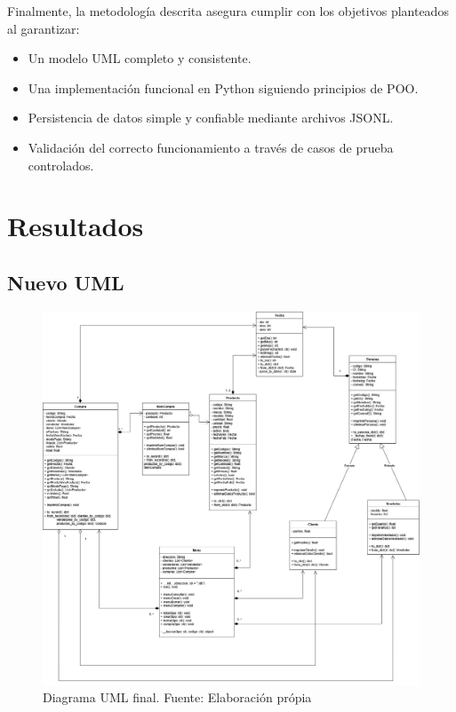 \documentclass[11pt]{article}
\begin{document}
\begin{enumerate}
Finalmente, la metodología descrita asegura cumplir con los objetivos planteados al garantizar:
\begin{itemize}
    \item Un modelo UML completo y consistente.
    \item Una implementación funcional en Python siguiendo principios de POO.
    \item Persistencia de datos simple y confiable mediante archivos JSONL.
    \item Validación del correcto funcionamiento a través de casos de prueba controlados.
\end{itemize}
\end{enumerate}



\section{Resultados}\label{sec:resultados}

\subsection{Nuevo UML}

\begin{figure}[H]
    \centering
    \includegraphics[width=0.84\linewidth]{./anexos/Diagrama UML Final.jpg}
    \caption{Diagrama UML final. Fuente: Elaboración própia}
    \label{fig:umlfinal}
\end{figure}
\end{document}
